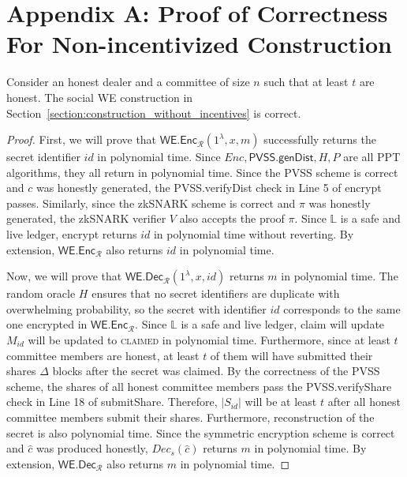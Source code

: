 \section{Appendix A: Proof of Correctness For Non-incentivized Construction}
\begin{theorem}\label{thm:correctness_hm_appendix}
    Consider an honest dealer and a committee of size $n$ such that at least $t$ are honest.
    The social WE construction in Section~\ref{section:construction_without_incentives} is correct.
\end{theorem}
\begin{proof}
    First, we will prove that $\textsf{WE.Enc}_\mathcal{R}(1^{\lambda}, x, m)$ successfully returns the secret identifier $id$ in polynomial time.
    Since $Enc, \textsf{PVSS.genDist}, H, P$ are all PPT algorithms, they all return in polynomial time.
    Since the PVSS scheme is correct and $c$ was honestly generated, the \textsf{PVSS.verifyDist} check in Line 5 of \textsf{encrypt} passes.
    Similarly, since the zkSNARK scheme is correct and $\pi$ was honestly generated, the zkSNARK verifier $V$ also accepts the proof $\pi$.
    Since $\mathbb{L}$ is a safe and live ledger, \textsf{encrypt} returns $id$ in polynomial time without reverting.
    By extension, $\textsf{WE.Enc}_\mathcal{R}$ also returns $id$ in polynomial time.

    Now, we will prove that $\textsf{WE.Dec}_\mathcal{R}(1^{\lambda}, x, id)$ returns $m$ in polynomial time.
    The random oracle $H$ ensures that no secret identifiers are duplicate with overwhelming probability, so the secret with identifier $id$ corresponds to the same one encrypted in $\textsf{WE.Enc}_\mathcal{R}$.
    Since $\mathbb{L}$ is a safe and live ledger, \textsf{claim} will update $M_{id}$ will be updated to \textsc{claimed} in polynomial time.
    Furthermore, since at least $t$ committee members are honest, at least $t$ of them will have submitted their shares $\Delta$ blocks after the secret was claimed.
    By the correctness of the PVSS scheme, the shares of all honest committee members pass the \textsf{PVSS.verifyShare} check in Line 18 of \textsf{submitShare}.
    Therefore, $|S_{id}|$ will be at least $t$ after all honest committee members submit their shares.
    Furthermore, reconstruction of the secret is also polynomial time.
    Since the symmetric encryption scheme is correct and $\hat{c}$ was produced honestly, $Dec_s(\hat{c})$ returns $m$ in polynomial time.
    By extension, $\textsf{WE.Dec}_\mathcal{R}$ also returns $m$ in polynomial time.
\end{proof}
